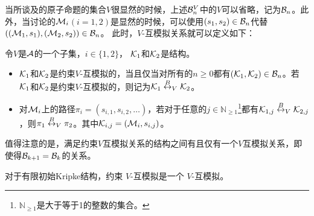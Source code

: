 当所谈及的原子命题的集合$V$很显然的时候，上述${\cal B}_n^V$中的$V$可以省略，记为${\cal B}_n$。此外，当讨论的${\cal M}_i$$(i=1,2)$是显然的时候，可以使用$(s_1,s_2) \in {\cal B}_n$代替$(({\cal M}_1,s_1),({\cal M}_2,s_2)) \in {\cal B}_n$。
此时，$V$-互模拟关系就可以定义如下：
\begin{definition}[约束$V$-互模拟]\label{def:V-bisimulation}
	令$V$是${\cal A}$的一个子集，$i\in \{1,2\}$， ${\cal K}_1$和${\cal K}_2$是结构。
	\begin{itemize}
		\item ${\cal K}_1$和${\cal K}_2$是约束$V$-互模拟的，当且仅当对所有的$n \ge 0$都有$({\cal K}_1, {\cal K}_2)\in {\cal B}_n$。若${\cal K}_1$和${\cal K}_2$是约束$V$-互模拟的，则记为${\cal K}_1 \overset{B}{\leftrightarrow}_V {\cal K}_2$。
		\item 对${\cal M}_i$上的路径$\pi_i=(s_{i,1},s_{i,2},\dots)$，若对于任意的$j\in \mathbb{N}_{\ge 1}$\footnote{$\mathbb{N}_{\ge 1}$是大于等于1的整数的集合。}都有${\cal K}_{1,j} \overset{B}{\leftrightarrow}_V {\cal K}_{2,j}$，则$\pi_1 \overset{B}{\leftrightarrow}_V \pi_2$。其中${\cal K}_{i, j}=({\cal M}_i, s_{i,j})$。
	\end{itemize}
\end{definition}

值得注意的是，满足约束$V$互模拟关系的结构之间有且仅有一个$V$互模拟关系，即使得${\cal B}_{k+1} = {\cal B}_k$的关系。


\begin{lemma} \label{lem:HbBis}
	对于有限初始Kripke结构，约束 $V$-互模拟是一个 $V$-互模拟。
\end{lemma}

